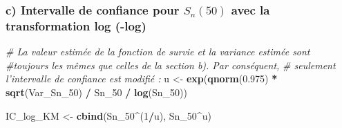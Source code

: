 \documentclass[]{article}
\newenvironment{Shaded}{\begin{snugshade}}{\end{snugshade}}
\newcommand{\KeywordTok}[1]{\textcolor[rgb]{0.13,0.29,0.53}{\textbf{#1}}}
\newcommand{\DecValTok}[1]{\textcolor[rgb]{0.00,0.00,0.81}{#1}}
\newcommand{\FloatTok}[1]{\textcolor[rgb]{0.00,0.00,0.81}{#1}}
\newcommand{\StringTok}[1]{\textcolor[rgb]{0.31,0.60,0.02}{#1}}
\newcommand{\CommentTok}[1]{\textcolor[rgb]{0.56,0.35,0.01}{\textit{#1}}}
\newcommand{\OperatorTok}[1]{\textcolor[rgb]{0.81,0.36,0.00}{\textbf{#1}}}
\newcommand{\NormalTok}[1]{#1}
\begin{document}
\subsubsection{\texorpdfstring{c) Intervalle de confiance pour
\(S_n(50)\) avec la transformation log
(-log)}{c) Intervalle de confiance pour S\_n(50) avec la transformation log (-log)}}\label{c-intervalle-de-confiance-pour-s_n50-avec-la-transformation-log--log-1}

\begin{Shaded}
\begin{Highlighting}[]
\CommentTok{# La valeur estimée de la fonction de survie et la variance estimée sont }
\CommentTok{#toujours les mêmes que celles de la section b). Par conséquent, }
\CommentTok{# seulement l'intervalle de confiance est modifié :}
\NormalTok{u <-}\StringTok{ }\KeywordTok{exp}\NormalTok{(}\KeywordTok{qnorm}\NormalTok{(}\FloatTok{0.975}\NormalTok{) }\OperatorTok{*}\StringTok{ }\KeywordTok{sqrt}\NormalTok{(Var_Sn_}\DecValTok{50}\NormalTok{) }\OperatorTok{/}\StringTok{ }\NormalTok{Sn_}\DecValTok{50} \OperatorTok{/}\StringTok{ }\KeywordTok{log}\NormalTok{(Sn_}\DecValTok{50}\NormalTok{))}

\NormalTok{IC_log_KM <-}\StringTok{ }\KeywordTok{cbind}\NormalTok{(Sn_}\DecValTok{50}\OperatorTok{^}\NormalTok{(}\DecValTok{1}\OperatorTok{/}\NormalTok{u),}
\NormalTok{              Sn_}\DecValTok{50}\OperatorTok{^}\NormalTok{u)}
\end{Highlighting}
\end{Shaded}
\end{document}
